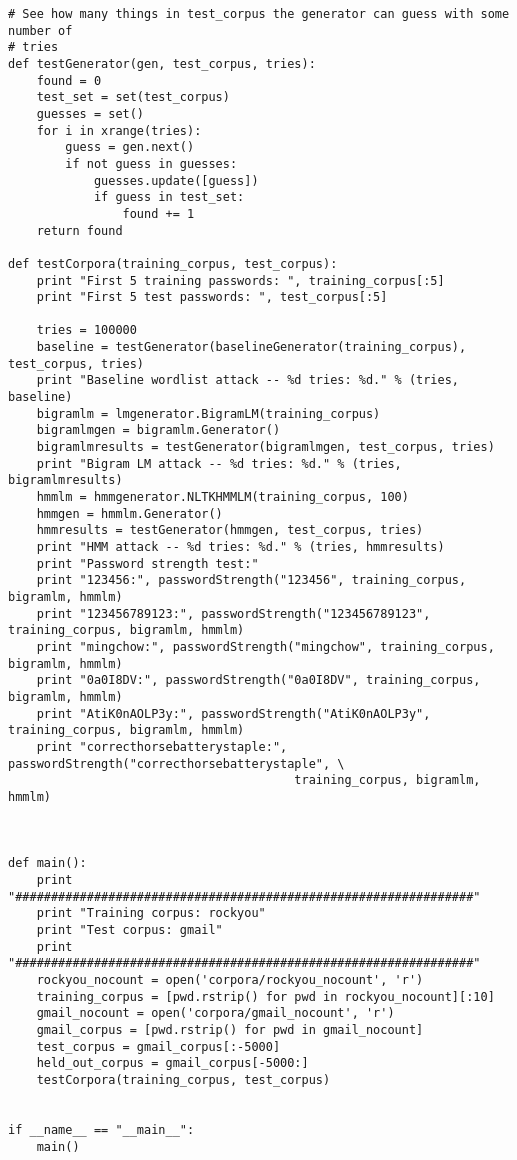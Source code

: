 \documentclass{amsart}
\theoremstyle{definition}
\theoremstyle{remark}
\numberwithin{equation}{section}
\begin{document}
\begin{lstlisting}
# See how many things in test_corpus the generator can guess with some number of
# tries
def testGenerator(gen, test_corpus, tries):
    found = 0
    test_set = set(test_corpus)
    guesses = set()
    for i in xrange(tries):
        guess = gen.next()
        if not guess in guesses:
            guesses.update([guess])
            if guess in test_set:
                found += 1
    return found

def testCorpora(training_corpus, test_corpus):
    print "First 5 training passwords: ", training_corpus[:5]
    print "First 5 test passwords: ", test_corpus[:5]

    tries = 100000
    baseline = testGenerator(baselineGenerator(training_corpus), test_corpus, tries)
    print "Baseline wordlist attack -- %d tries: %d." % (tries, baseline)
    bigramlm = lmgenerator.BigramLM(training_corpus)
    bigramlmgen = bigramlm.Generator()
    bigramlmresults = testGenerator(bigramlmgen, test_corpus, tries)
    print "Bigram LM attack -- %d tries: %d." % (tries, bigramlmresults)
    hmmlm = hmmgenerator.NLTKHMMLM(training_corpus, 100)
    hmmgen = hmmlm.Generator()
    hmmresults = testGenerator(hmmgen, test_corpus, tries)
    print "HMM attack -- %d tries: %d." % (tries, hmmresults)
    print "Password strength test:"
    print "123456:", passwordStrength("123456", training_corpus, bigramlm, hmmlm)
    print "123456789123:", passwordStrength("123456789123", training_corpus, bigramlm, hmmlm)
    print "mingchow:", passwordStrength("mingchow", training_corpus, bigramlm, hmmlm)
    print "0a0I8DV:", passwordStrength("0a0I8DV", training_corpus, bigramlm, hmmlm)
    print "AtiK0nAOLP3y:", passwordStrength("AtiK0nAOLP3y", training_corpus, bigramlm, hmmlm)
    print "correcthorsebatterystaple:", passwordStrength("correcthorsebatterystaple", \
                                        training_corpus, bigramlm, hmmlm)

 

def main():
    print "################################################################"
    print "Training corpus: rockyou"
    print "Test corpus: gmail"
    print "################################################################"
    rockyou_nocount = open('corpora/rockyou_nocount', 'r')
    training_corpus = [pwd.rstrip() for pwd in rockyou_nocount][:10]
    gmail_nocount = open('corpora/gmail_nocount', 'r')
    gmail_corpus = [pwd.rstrip() for pwd in gmail_nocount]
    test_corpus = gmail_corpus[:-5000]
    held_out_corpus = gmail_corpus[-5000:]
    testCorpora(training_corpus, test_corpus)


if __name__ == "__main__":
    main()
\end{lstlisting}
\newpage
\end{document}
